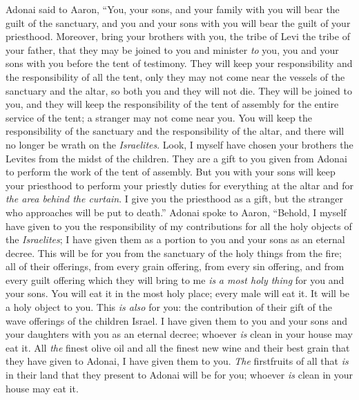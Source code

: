 \begin{biblechapter} %
 Adonai said to Aaron, “You, your sons, and your family with you will bear the guilt of the sanctuary, and you and your sons with you will bear the guilt of your priesthood.
\verse Moreover, bring your brothers with you, the tribe of Levi the tribe of your father, that they may be joined to you and minister \textit{to} you, you and your sons with you before the tent of testimony.
\verse They will keep your responsibility and the responsibility of all the tent, only they may not come near the vessels of the sanctuary and the altar, so both you and they will not die.
\verse They will be joined to you, and they will keep the responsibility of the tent of assembly for the entire service of the tent; a stranger may not come near you.
\verse You will keep the responsibility of the sanctuary and the responsibility of the altar, and there will no longer be wrath on the \textit{Israelites}.
\verse Look, I myself have chosen your brothers the Levites from the midst of the children. They are a gift to you given from Adonai to perform the work of the tent of assembly.
\verse But you with your sons will keep your priesthood to perform your priestly duties for everything at the altar and for \textit{the area behind the curtain}. I give you the priesthood as a gift, but the stranger who approaches will be put to death.”
 Adonai spoke to Aaron, “Behold, I myself have given to you the responsibility of my contributions for all the holy objects of the \textit{Israelites}; I have given them as a portion to you and your sons as an eternal decree.
\verse This will be for you from the sanctuary of the holy things from the fire; all of their offerings, from every grain offering, from every sin offering, and from every guilt offering which they will bring to me \textit{is} \textit{a most holy thing} for you and your sons.
\verse You will eat it in the most holy place; every male will eat it. It will be a holy object to you.
\verse This \textit{is also} for you: the contribution of their gift of the wave offerings of the children Israel. I have given them to you and your sons and your daughters with you as an eternal decree; whoever \textit{is} clean in your house may eat it.
\verse All \textit{the} finest olive oil and all the finest new wine and their best grain that they have given to Adonai, I have given them to you.
\verse \textit{The} firstfruits of all that \textit{is} in their land that they present to Adonai will be for you; whoever \textit{is} clean in your house may eat it.

\end{biblechapter}
